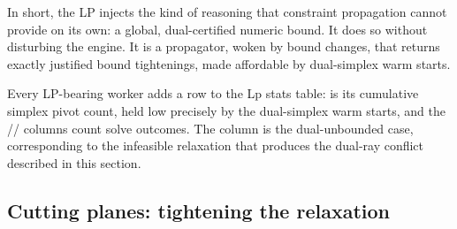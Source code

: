 In short, the LP injects the kind of reasoning that constraint propagation cannot
provide on its own: a global, dual-certified numeric bound. It does so without
disturbing the engine. It is a propagator, woken by bound changes, that returns
exactly justified bound tightenings, made affordable by dual-simplex warm starts.

\begin{platypuslog}[htb]
Every LP-bearing worker adds a row to the \textsf{Lp stats} table:
 is its cumulative simplex pivot count, held low precisely by
the dual-simplex warm starts, and the //
columns count solve outcomes. The  column is the dual-unbounded
case, corresponding to the infeasible relaxation that produces the dual-ray
conflict described in this section.
\end{platypuslog}
\subsection{Cutting planes: tightening the relaxation}\label{sec:cuts}

